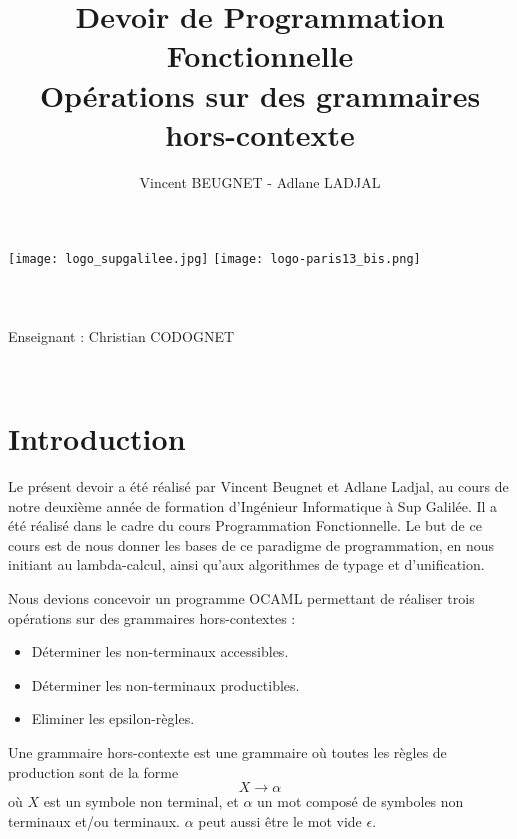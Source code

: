 \documentclass[11pt,a4paper]{article}
\author{Vincent BEUGNET - Adlane LADJAL}
\title{Devoir de Programmation Fonctionnelle \\ Opérations sur des grammaires hors-contexte}
\begin{document}
\makeatletter
\begin{titlepage}
	\centering
	\texttt{[image: logo\_supgalilee.jpg]}
	\hfill
	\texttt{[image: logo-paris13\_bis.png]} \\
    \vspace{5cm}
       {\LARGE \textbf{\@title}} \\
    \vspace{2em}
        {\large \@author }\\
    \vspace{1em}
        {\textit{\@date}} \\
    \vspace{2em}
    	\vspace{2em}
    		{Enseignant : Christian CODOGNET} \\
    \vfill
\end{titlepage}


\newpage
~
\newpage

\renewcommand{\contentsname}{Sommaire}
\tableofcontents

\newpage

\pagestyle{plain}

\section{Introduction}
Le présent devoir a été réalisé par Vincent Beugnet 
et Adlane Ladjal, au cours de notre deuxième année 
de formation d'Ingénieur Informatique à  Sup Galilée.
Il a été réalisé dans le cadre du cours Programmation
Fonctionnelle. Le but de ce cours est de nous donner 
les bases de ce paradigme de programmation, en nous
initiant au lambda-calcul, ainsi qu'aux algorithmes de 
typage et d'unification.

Nous devions concevoir un programme OCAML permettant de
réaliser trois opérations sur des grammaires hors-contextes : 

\begin{itemize}
    \item Déterminer les non-terminaux accessibles.
    \item Déterminer les non-terminaux productibles.
    \item Eliminer les epsilon-règles.
\end{itemize}

Une grammaire hors-contexte est une grammaire où toutes les
règles de production sont de la forme \[ X \rightarrow \alpha \]
où $X$ est un symbole non terminal, et $\alpha$ un mot composé
de symboles non terminaux et/ou terminaux. $\alpha$ peut aussi
être le mot vide $\epsilon$.
\newpage
\end{document}
